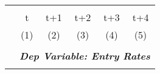 \begin{tabular}{lccccc} \hline
    \vspace{-2pt} & \vspace{-2pt} & \vspace{-2pt} & \vspace{-2pt} & \vspace{-2pt} \\
     & t & t+1 & t+2 & t+3 & t+4 \\ 
     & (1) & (2) & (3) & (4) & (5) \\
    \hline 
   
    \vspace{-1.5pt} & \vspace{-1.5pt} & \vspace{-1.5pt} & \vspace{-1.5pt} & \vspace{-1.5pt} \\
    &\multicolumn{5}{c}{\textit{\textbf{Dep Variable: Entry Rates}}} \\ 
    \vspace{-1.5pt} & \vspace{-1.5pt} & \vspace{-1.5pt} & \vspace{-1.5pt} & \vspace{-1.5pt} \\
    \cmidrule{2-6}
    

\end{tabular}
